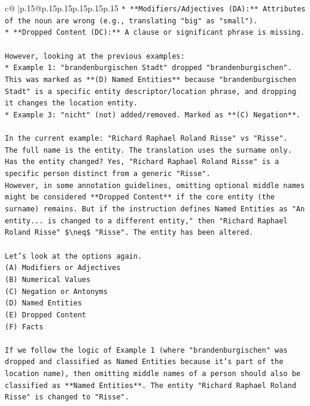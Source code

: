 \documentclass{article}
\begin{document}
{\begin{supertabular}{c@{$\;$}|p{.15\linewidth}@{}p{.15\linewidth}p{.15\linewidth}p{.15\linewidth}p{.15\linewidth}p{.15\linewidth}}
{{{\texttt{*   **Modifiers/Adjectives (DA):** Attributes of the noun are wrong (e.g., translating "big" as "small").} \\
\texttt{*   **Dropped Content (DC):** A clause or significant phrase is missing.} \\
\\ 
\texttt{However, looking at the previous examples:} \\
\texttt{*   Example 1: "brandenburgischen Stadt" dropped "brandenburgischen". This was marked as **(D) Named Entities** because "brandenburgischen Stadt" is a specific entity descriptor/location phrase, and dropping it changes the location entity.} \\
\texttt{*   Example 3: "nicht" (not) added/removed. Marked as **(C) Negation**.} \\
\\ 
\texttt{In the current example: "Richard Raphael Roland Risse" vs "Risse".} \\
\texttt{The full name is the entity. The translation uses the surname only. Has the entity changed? Yes, "Richard Raphael Roland Risse" is a specific person distinct from a generic "Risse".} \\
\texttt{However, in some annotation guidelines, omitting optional middle names might be considered **Dropped Content** if the core entity (the surname) remains. But if the instruction defines Named Entities as "An entity... is changed to a different entity," then "Richard Raphael Roland Risse" \$\textbackslash{}neq\$ "Risse". The entity has been altered.} \\
\\ 
\texttt{Let's look at the options again.} \\
\texttt{(A) Modifiers or Adjectives} \\
\texttt{(B) Numerical Values} \\
\texttt{(C) Negation or Antonyms} \\
\texttt{(D) Named Entities} \\
\texttt{(E) Dropped Content} \\
\texttt{(F) Facts} \\
\\ 
\texttt{If we follow the logic of Example 1 (where "brandenburgischen" was dropped and classified as Named Entities because it's part of the location name), then omitting middle names of a person should also be classified as **Named Entities**. The entity "Richard Raphael Roland Risse" is changed to "Risse".} \\
\\ 
}}}
\end{supertabular}}
\end{document}
